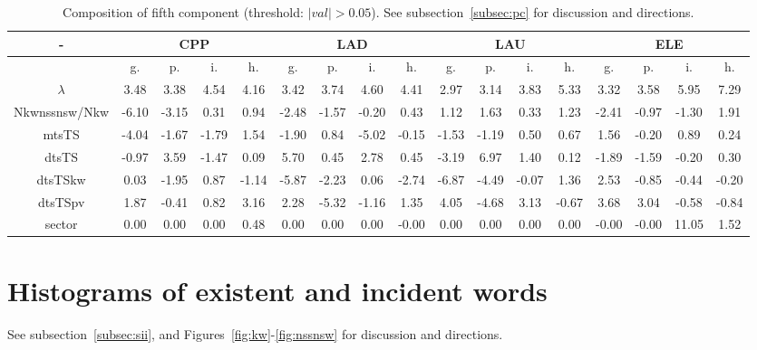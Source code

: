 \documentclass[%
 aip,
 jmp,%
 amsmath,amssymb,
 reprint,%
 floatfix,
]{revtex4-1}
\begin{document}
\begin{table}
\begin{tabular}{|c|| c|c|c|c|| c|c|c|c|| c|c|c|c|| c|c|c|c|}\hline
  \centering
    \scriptsize
\setlength{\tabcolsep}{.06667em}
-\-  & \multicolumn{4}{c|}{CPP} & \multicolumn{4}{c|}{LAD} & \multicolumn{4}{c|}{LAU} & \multicolumn{4}{c|}{ELE} \\ \hline\hline
 & g. & p. & i. & h. &     g. & p. & i. & h. &    g. & p. & i. & h. &    g. & p. & i. & h. \\\hline
$\lambda$ & 3.48 & 3.38 & 4.54 & 4.16 & 3.42 & 3.74 & 4.60 & 4.41 & 2.97 & 3.14 & 3.83 & 5.33 & 3.32 & 3.58 & 5.95 & 7.29 \\\hline
Nkwnssnsw/Nkw & -6.10 & -3.15 & 0.31 & 0.94 & -2.48 & -1.57 & -0.20 & 0.43 & 1.12 & 1.63 & 0.33 & 1.23 & -2.41 & -0.97 & -1.30 & 1.91 \\\hline
mtsTS & -4.04 & -1.67 & -1.79 & 1.54 & -1.90 & 0.84 & -5.02 & -0.15 & -1.53 & -1.19 & 0.50 & 0.67 & 1.56 & -0.20 & 0.89 & 0.24 \\\hline
dtsTS & -0.97 & 3.59 & -1.47 & 0.09 & 5.70 & 0.45 & 2.78 & 0.45 & -3.19 & 6.97 & 1.40 & 0.12 & -1.89 & -1.59 & -0.20 & 0.30 \\\hline
dtsTSkw & 0.03 & -1.95 & 0.87 & -1.14 & -5.87 & -2.23 & 0.06 & -2.74 & -6.87 & -4.49 & -0.07 & 1.36 & 2.53 & -0.85 & -0.44 & -0.20 \\\hline
dtsTSpv & 1.87 & -0.41 & 0.82 & 3.16 & 2.28 & -5.32 & -1.16 & 1.35 & 4.05 & -4.68 & 3.13 & -0.67 & 3.68 & 3.04 & -0.58 & -0.84 \\\hline
sector & 0.00 & 0.00 & 0.00 & 0.48 & 0.00 & 0.00 & 0.00 & -0.00 & 0.00 & 0.00 & 0.00 & 0.00 & -0.00 & -0.00 & 11.05 & 1.52 \\\hline
\end{tabular}
  \caption{Composition of fifth component (threshold: $|val|>0.05$). See subsection~\ref{subsec:pc} for discussion and directions.}\label{tab:pca5}
\end{table}

\clearpage
\newpage
\section{Histograms of existent and incident words}\label{sec:resE}
 See subsection~\ref{subsec:sii}, and Figures~\ref{fig:kw}-\ref{fig:nssnsw} for discussion and directions.
\end{document}
